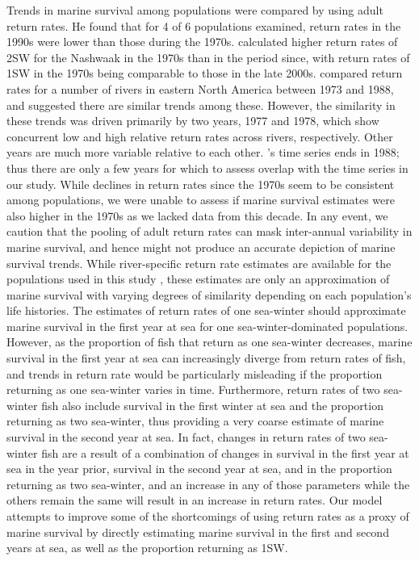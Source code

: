 \documentclass[12pt]{article}
\begin{document}
Trends in marine survival
among populations were compared by \citet{Chaput2012a} using adult return rates.
He found that for 4 of 6 populations examined, return rates in the 1990s 
were lower than those during the 1970s.
\citet{Gibson2016} calculated higher return rates of 2SW for the Nashwaak in
the 1970s than in the period since, with return rates of 1SW in the 1970s
being comparable to those in the late 2000s.
\citet{Friedland1993} compared return rates for a number of rivers in eastern
North America between 1973 and 1988, and suggested there are similar trends among these. 
However, the similarity in these trends was driven primarily by two years, 1977 and 1978, which
show concurrent low and high relative return rates across rivers,
respectively. Other years are much more variable relative to each other.
\citeauthor{Friedland1993}'s \citeyear{Friedland1993} time series ends in  
1988; thus there are only a few years for which to assess overlap with the
time series in our study.
While declines in return rates since the 1970s seem to be consistent among populations, 
we were unable to assess if marine survival estimates were also higher in the 1970s as we lacked 
data from this decade.
In any event, we caution that the pooling of adult return rates \citep{Chaput2012a, Friedland1993,Gibson2016} 
can mask inter-annual variability in marine survival,
and hence might not produce an accurate depiction of marine survival trends.
While river-specific return rate estimates are available for the populations
used in this study \citep{ICES2019}, these estimates are only an approximation
of marine survival with varying degrees of similarity depending on each
population's life histories. The estimates of return rates of one sea-winter
should approximate marine survival in the first year at sea for one
sea-winter-dominated populations. However, as the proportion of fish that
return as one sea-winter decreases, marine survival in the first year at sea
can increasingly diverge from return rates of fish, and trends in return rate
would be particularly misleading if the proportion returning as one sea-winter
varies in time. 
Furthermore, return rates of two sea-winter fish also include survival in the
first winter at sea and the proportion returning as two sea-winter, thus
providing a very coarse estimate of marine survival in the second year at sea. 
In fact, changes in return rates of two sea-winter fish are a result of a
combination of changes in survival in the first year at sea in the year prior,
survival in the second year at sea, and in the proportion returning as two
sea-winter, and an increase in any of those parameters while the others remain
the same will result in an increase in return rates. Our model attempts to
improve some of the shortcomings of using return rates as a proxy of marine
survival by directly estimating marine survival in the first and second years
at sea, as well as the proportion returning as 1SW.
\end{document}

